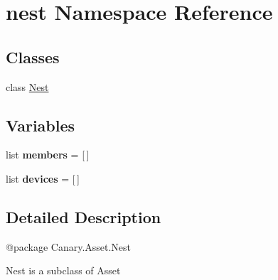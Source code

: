 \hypertarget{namespacenest}{\section{nest Namespace Reference}
\label{namespacenest}
}
\subsection*{Classes}
\begin{DoxyCompactItemize}
\item 
class \hyperlink{classnest_1_1_nest}{Nest}
\end{DoxyCompactItemize}
\subsection*{Variables}
\begin{DoxyCompactItemize}
\item 
\hypertarget{namespacenest_a5dd443347ff8776c0e1c6d2ba4225845}{list {\bfseries members} = \mbox{[}$\,$\mbox{]}}\label{namespacenest_a5dd443347ff8776c0e1c6d2ba4225845}

\item 
\hypertarget{namespacenest_ab730b69fd5eac5a436265a501613b55c}{list {\bfseries devices} = \mbox{[}$\,$\mbox{]}}\label{namespacenest_ab730b69fd5eac5a436265a501613b55c}

\end{DoxyCompactItemize}


\subsection{Detailed Description}
\begin{DoxyVerb}@package Canary.Asset.Nest

Nest is a subclass of Asset
\end{DoxyVerb}
 